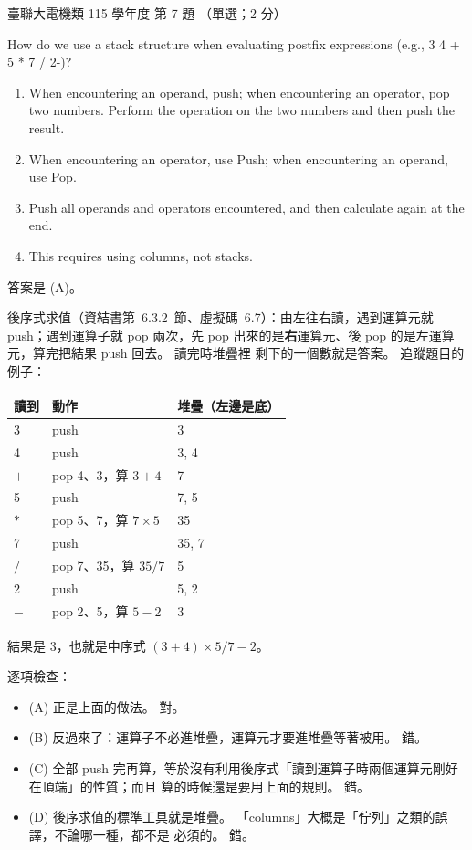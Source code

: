 \begin{pastexam}[label={px:ust-115-ee-ds-07}]{臺聯大電機類 115 學年度 第 7 題}
（單選；2 分）

How do we use a stack structure when evaluating postfix expressions (e.g., 3 4 + 5 * 7 / 2-)?
\begin{enumerate}[label=(\Alph*)]
\item When encountering an operand, push; when encountering an operator, pop two numbers. Perform
the operation on the two numbers and then push the result.
\item When encountering an operator, use Push; when encountering an operand, use Pop.
\item Push all operands and operators encountered, and then calculate again at the end.
\item This requires using columns, not stacks.
\end{enumerate}
\end{pastexam}

\begin{pastsoln}
答案是 (A)。

後序式求值（資結書第~6.3.2~節、虛擬碼~6.7）：由左往右讀，遇到運算元就 push；遇到運算子就 pop
兩次，先 pop 出來的是\textbf{右}運算元、後 pop 的是左運算元，算完把結果 push 回去。 讀完時堆疊裡
剩下的一個數就是答案。 追蹤題目的例子：
\begin{center}
\begin{tabular}{lll}
\toprule
讀到 & 動作 & 堆疊（左邊是底） \\
\midrule
3 & push & 3 \\
4 & push & 3, 4 \\
$+$ & pop 4、3，算 $3 + 4$ & 7 \\
5 & push & 7, 5 \\
$*$ & pop 5、7，算 $7 \times 5$ & 35 \\
7 & push & 35, 7 \\
$/$ & pop 7、35，算 $35 / 7$ & 5 \\
2 & push & 5, 2 \\
$-$ & pop 2、5，算 $5 - 2$ & 3 \\
\bottomrule
\end{tabular}
\end{center}
結果是 $3$，也就是中序式 $(3 + 4) \times 5 / 7 - 2$。

逐項檢查：
\begin{itemize}
\item (A) 正是上面的做法。 對。
\item (B) 反過來了：運算子不必進堆疊，運算元才要進堆疊等著被用。 錯。
\item (C) 全部 push 完再算，等於沒有利用後序式「讀到運算子時兩個運算元剛好在頂端」的性質；而且
算的時候還是要用上面的規則。 錯。
\item (D) 後序求值的標準工具就是堆疊。 「columns」大概是「佇列」之類的誤譯，不論哪一種，都不是
必須的。 錯。
\end{itemize}
\end{pastsoln}
